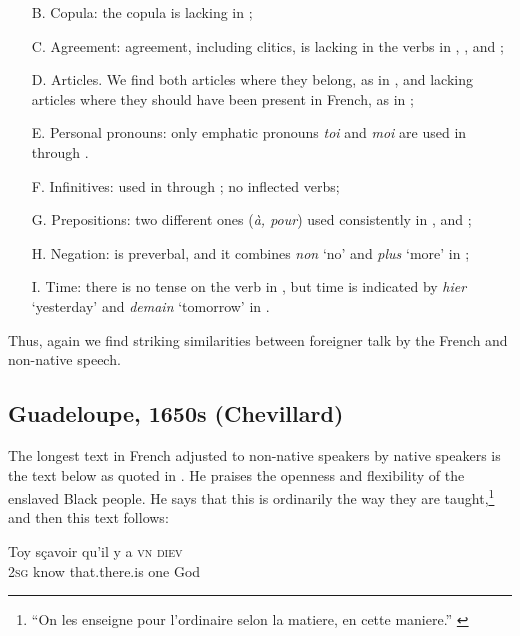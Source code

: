 \documentclass[output=paper,colorlinks,citecolor=brown]{langscibook}
\begin{document}
\begin{itemize}
\item [B.] Copula: the copula is lacking in ;
\item [C.] Agreement: agreement, including clitics, is lacking in the verbs in , ,  and ;
\item [D.] Articles. We find both articles where they belong, as in , and lacking articles where they should have been present in French, as in ;
\item [E.] Personal pronouns: only emphatic pronouns\textit{ toi} and \textit{moi} are used in  through .
\item [F.] Infinitives: used in  through ; no inflected verbs;
\item [G.] Prepositions: two different ones (\textit{à, pour}) used consistently in ,  and ;
\item [H.] Negation: is preverbal, and it combines \textit{non} `no'  and \textit{plus }`more'  in ;
\item [I.] Time: there is no tense on the verb in , but time is indicated by \textit{hier} `yesterday'  and \textit{demain} `tomorrow'  in .
\end{itemize}
Thus, again we find striking similarities between foreigner talk by the French and non-native speech.

\subsection{Guadeloupe, 1650s (Chevillard)} \label{sec:bakker:3.3}

 
The longest text in French adjusted to non-native speakers by native speakers is the text below as quoted in \citet[145--146]{Chevillard1659}. He praises the openness and flexibility of the enslaved Black people. He says that this is ordinarily the way they are taught,\footnote{“On les enseigne pour l’ordinaire selon la matiere, en cette maniere.”  \citep[145]{Chevillard1659}} and then this text follows:

\ea \label{ex:bakker:14}
\ea \label{ex:bakker:14a}
\gll Toy sçavoir qu'il y a \textsc{vn} \textsc{diev}\\
    2\textsc{sg} know that.there.is  one God\\
\end{document}
